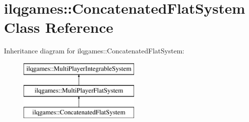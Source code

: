 \hypertarget{classilqgames_1_1_concatenated_flat_system}{}\section{ilqgames\+:\+:Concatenated\+Flat\+System Class Reference}
\label{classilqgames_1_1_concatenated_flat_system}
Inheritance diagram for ilqgames\+:\+:Concatenated\+Flat\+System\+:\begin{figure}[H]
\begin{center}
\leavevmode
\includegraphics[height=3.000000cm]{classilqgames_1_1_concatenated_flat_system}
\end{center}
\end{figure}

